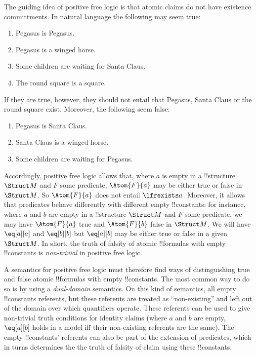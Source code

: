 \documentclass[../../../include/open-logic-section]{subfiles}
\begin{document}


The guiding idea of positive free logic is that atomic claims do not have
existence committments. In natural language the following may seem true:

\begin{enumerate}
  \item Pegasus is Pegasus.
  \item Pegasus is a winged horse.
  \item Some children are waiting for Santa Claus.
  \item The round square is a square.
\end{enumerate}

If they are true, however, they should not entail that Pegasus, 
Santa Claus or the round square exist. Moreover, the following seem 
false:

\begin{enumerate}
  \item Pegasus is Santa Claus.
  \item Santa Claus is a winged horse.
  \item Some children are waiting for Pegasus.
\end{enumerate}

Accordingly, positive free logic allows that, where $a$ is empty in a 
!!{structure} $\Struct M$ and $F$ some predicate, $\Atom{F}{a}$ may be 
either true or false in $\Struct M$. So $\Atom{F}{a}$ does not 
entail $\lfrexists a$. Moreover, it allows that predicates behave 
differently with different empty !!{constant}s: for instance, where 
$a$ and $b$ are empty in a !!{structure} $\Struct M$ and $F$ some 
predicate, we may have $\Atom{F}{a}$ true and $\Atom{F}{b}$ false
in $\Struct M$. We will have $\eq[a][a]$ and $\eq[b][b]$ but 
$\eq[a][b]$ may be either true or false in a given $\Struct M$. In short,
the truth of falsity of atomic !!{formula}s with empty !!{constant}s is
\emph{non-trivial} in positive free logic.

\begin{explain}
A semantics for positive free logic must therefore find ways of distinguishing
true and false atomic !!{formula}s with empty !!{constant}s. The most
common way to do so is by using a \emph{dual-domain} semantics. On this
kind of semantics, all empty !!{constant}s referents, but these referents
are treated as ``non-existing'' and left out of the domain over which
quantifiers operate. These referents can be used to give non-trivial
truth conditions for identity claims (where $a$ and $b$ are empty,
$\eq[a][b]$ holds in a model iff their non-existing referents are the 
same). The empty !!{constant}s' referents can also be part of the extension 
of predicates, which in turns determines the the truth of falsity of claim 
using these !!{constant}s.
\end{explain}
\end{document}
